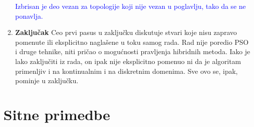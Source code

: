 \documentclass[a4paper]{report}
\newcommand{\odgovor}[1]{\textcolor{blue}{#1}}
\begin{document}
\begin{enumerate}
    \odgovor{Izbrisan je deo vezan za topologije koji nije vezan u poglavlju, tako da se ne ponavlja.  }
    
    \item \textbf{Zaključak} Ceo prvi pasus u zaključku diskutuje stvari koje nisu zapravo pomenute ili eksplicitno naglašene u toku samog rada. Rad nije poredio PSO i druge tehnike, niti pričao o mogućnosti pravljenja hibridnih metoda. Iako je lako zaključiti iz rada, on ipak nije eksplicitno pomenuo ni da je algoritam primenljiv i na kontinualnim i na diskretnim domenima. Sve ovo se, ipak, pominje u zaključku.
\end{enumerate}

\section{Sitne primedbe}
\end{document}

